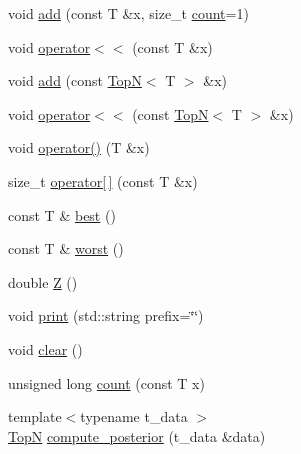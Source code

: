 \begin{DoxyCompactItemize}
\item 
void \hyperlink{class_fleet_1_1_statistics_1_1_top_n_a71f34724832a34c029bfeeb6e1dea24f}{add} (const T \&x, size\+\_\+t \hyperlink{class_fleet_1_1_statistics_1_1_top_n_a341df027d3283fe3a9bf3766521e126d}{count}=1)
\item 
void \hyperlink{class_fleet_1_1_statistics_1_1_top_n_af54651d8e83bdcc6b3ffbcef3aa3fd6e}{operator$<$$<$} (const T \&x)
\item 
void \hyperlink{class_fleet_1_1_statistics_1_1_top_n_ac1a720c5f52f0486377274bd1e6a052a}{add} (const \hyperlink{class_fleet_1_1_statistics_1_1_top_n}{TopN}$<$ T $>$ \&x)
\item 
void \hyperlink{class_fleet_1_1_statistics_1_1_top_n_a73cb4911b6dc2bdc56f466ca4b93ef9d}{operator$<$$<$} (const \hyperlink{class_fleet_1_1_statistics_1_1_top_n}{TopN}$<$ T $>$ \&x)
\item 
void \hyperlink{class_fleet_1_1_statistics_1_1_top_n_a3300639fe8eef303fb66e1630dc0790c}{operator()} (T \&x)
\item 
size\+\_\+t \hyperlink{class_fleet_1_1_statistics_1_1_top_n_acb11e623b45dbec10f2c1ac9a48b0eef}{operator\mbox{[}$\,$\mbox{]}} (const T \&x)
\item 
const T \& \hyperlink{class_fleet_1_1_statistics_1_1_top_n_a61aa70a203ecf97f79d26cb4bcfe2071}{best} ()
\item 
const T \& \hyperlink{class_fleet_1_1_statistics_1_1_top_n_a7be596fb7defba492b503371c58b30ce}{worst} ()
\item 
double \hyperlink{class_fleet_1_1_statistics_1_1_top_n_aa94e0f1e4df0ba70b35abcc540b7cb03}{Z} ()
\item 
void \hyperlink{class_fleet_1_1_statistics_1_1_top_n_ae37eb4f39eb12d32a1f04aa30276da86}{print} (std\+::string prefix=\char`\"{}\char`\"{})
\item 
void \hyperlink{class_fleet_1_1_statistics_1_1_top_n_ab57188b1858802dcf1f26dbcf702c6ae}{clear} ()
\item 
unsigned long \hyperlink{class_fleet_1_1_statistics_1_1_top_n_a341df027d3283fe3a9bf3766521e126d}{count} (const T x)
\item 
{\footnotesize template$<$typename t\+\_\+data $>$ }\\\hyperlink{class_fleet_1_1_statistics_1_1_top_n}{TopN} \hyperlink{class_fleet_1_1_statistics_1_1_top_n_ac6ab403d6833e58352e24110ee379fbf}{compute\+\_\+posterior} (t\+\_\+data \&data)
\end{DoxyCompactItemize}
